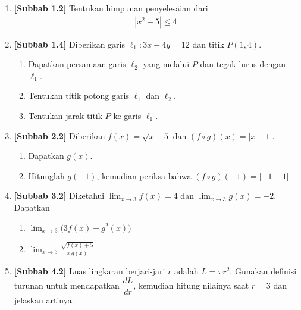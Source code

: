 \documentclass[10pt,openany,a4paper]{article}
\theoremstyle{definition}
\theoremstyle{definition}
\theoremstyle{plain}
\begin{document}
\begin{enumerate}
    \item \textbf{[Subbab 1.2]} Tentukan himpunan penyelesaian dari
    \begin{align*}
        \left|x^2-5\right|\leq 4.
    \end{align*}

    \item \textbf{[Subbab 1.4]} Diberikan garis $\ell_1: 3x-4y=12$ dan titik $P(1,4)$.
    \begin{enumerate}
        \item Dapatkan persamaan garis $\ell_2$ yang melalui $P$ dan tegak lurus dengan $\ell_1$.
        \item Tentukan titik potong garis $\ell_1$ dan $\ell_2$.
        \item Tentukan jarak titik $P$ ke garis $\ell_1$.
    \end{enumerate}

    \item \textbf{[Subbab 2.2]} Diberikan $f(x)=\sqrt{x+5}$ dan $(f\circ g)(x)=|x-1|$.
    \begin{enumerate}
        \item Dapatkan $g(x)$.
        \item Hitunglah $g(-1)$, kemudian periksa bahwa $(f\circ g)(-1)=|-1-1|$.
    \end{enumerate}

    \item \textbf{[Subbab 3.2]} Diketahui $\displaystyle\lim_{x\to 3}f(x)=4$ dan $\displaystyle\lim_{x\to 3}g(x)=-2$. Dapatkan
    \begin{enumerate}
        \item $\displaystyle\lim_{x\to 3}\big(3f(x)+g^2(x)\big)$
        \item $\displaystyle\lim_{x\to 3}\frac{\sqrt{f(x)+5}}{x\,g(x)}$
    \end{enumerate}

    \item \textbf{[Subbab 4.2]} Luas lingkaran berjari-jari $r$ adalah $L=\pi r^2$. Gunakan definisi turunan untuk mendapatkan $\dfrac{dL}{dr}$, kemudian hitung nilainya saat $r=3$ dan jelaskan artinya.
\end{enumerate}
\end{document}
